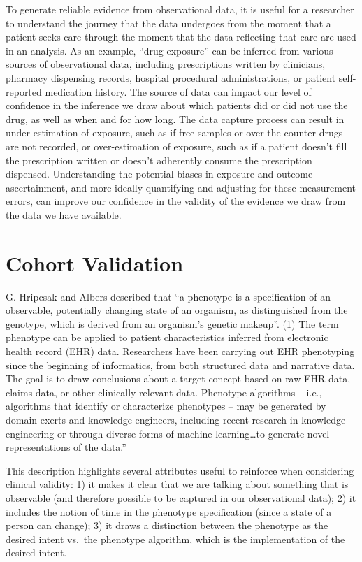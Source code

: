 \documentclass[
  letterpaper,
  paper=7in:10in,
  pagesize=pdftex,
  headinclude=on,
  footinclude=on,
  12pt]{scrbook}
\begin{document}
To generate reliable evidence from observational data, it is useful for
a researcher to understand the journey that the data undergoes from the
moment that a patient seeks care through the moment that the data
reflecting that care are used in an analysis. As an example, ``drug
exposure'' can be inferred from various sources of observational data,
including prescriptions written by clinicians, pharmacy dispensing
records, hospital procedural administrations, or patient self-reported
medication history. The source of data can impact our level of
confidence in the inference we draw about which patients did or did not
use the drug, as well as when and for how long. The data capture process
can result in under-estimation of exposure, such as if free samples or
over-the counter drugs are not recorded, or over-estimation of exposure,
such as if a patient doesn't fill the prescription written or doesn't
adherently consume the prescription dispensed. Understanding the
potential biases in exposure and outcome ascertainment, and more ideally
quantifying and adjusting for these measurement errors, can improve our
confidence in the validity of the evidence we draw from the data we have
available.

\section{Cohort Validation}\label{cohort-validation}

G. Hripcsak and Albers described that ``a phenotype is a specification
of an observable, potentially changing state of an organism, as
distinguished from the genotype, which is derived from an organism's
genetic makeup''. (1) The term phenotype can be applied to patient
characteristics inferred from electronic health record (EHR) data.
Researchers have been carrying out EHR phenotyping since the beginning
of informatics, from both structured data and narrative data. The goal
is to draw conclusions about a target concept based on raw EHR data,
claims data, or other clinically relevant data. Phenotype algorithms --
i.e., algorithms that identify or characterize phenotypes -- may be
generated by domain exerts and knowledge engineers, including recent
research in knowledge engineering or through diverse forms of machine
learning\ldots to generate novel representations of the data.''

This description highlights several attributes useful to reinforce when
considering clinical validity: 1) it makes it clear that we are talking
about something that is observable (and therefore possible to be
captured in our observational data); 2) it includes the notion of time
in the phenotype specification (since a state of a person can change);
3) it draws a distinction between the phenotype as the desired intent
vs.~the phenotype algorithm, which is the implementation of the desired
intent.
\end{document}
